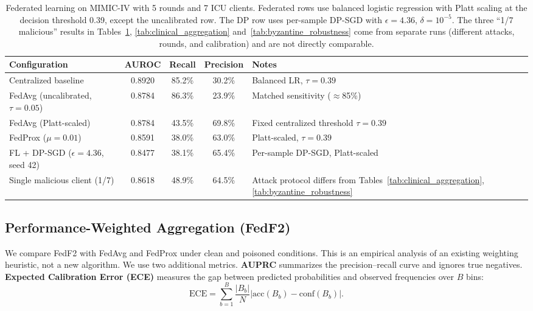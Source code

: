 \documentclass[journal]{IEEEtran}
\begin{document}
\begin{table}[t]
\caption{Federated learning on MIMIC-IV with 5 rounds and 7 ICU clients. Federated rows use balanced logistic regression with Platt scaling at the decision threshold 0.39, except the uncalibrated row. The DP row uses per-sample DP-SGD with $\epsilon=4.36$, $\delta=10^{-5}$. The three ``1/7 malicious'' results in Tables~\ref{tab:performance}, \ref{tab:clinical_aggregation} and~\ref{tab:byzantine_robustness} come from separate runs (different attacks, rounds, and calibration) and are not directly comparable.}
\centering
\small
\begin{tabular}{lcccl}
\toprule
\textbf{Configuration} & \textbf{AUROC} & \textbf{Recall} & \textbf{Precision} & \textbf{Notes} \\
\midrule
Centralized baseline & 0.8920 & 85.2\% & 30.2\% & Balanced LR, $\tau=0.39$ \\
FedAvg (uncalibrated, $\tau=0.05$) & 0.8784 & 86.3\% & 23.9\% & Matched sensitivity ($\approx$85\%) \\
FedAvg (Platt-scaled) & 0.8784 & 43.5\% & 69.8\% & Fixed centralized threshold $\tau=0.39$ \\
FedProx ($\mu=0.01$) & 0.8591 & 38.0\% & 63.0\% & Platt-scaled, $\tau=0.39$ \\
\midrule
FL + DP-SGD ($\epsilon = 4.36$, seed 42) & 0.8477 & 38.1\% & 65.4\% & Per-sample DP-SGD, Platt-scaled \\
\midrule
Single malicious client (1/7) & 0.8618 & 48.9\% & 64.5\% & Attack protocol differs from Tables~\ref{tab:clinical_aggregation}, \ref{tab:byzantine_robustness} \\
\bottomrule
\end{tabular}
\label{tab:performance}
\end{table}

\subsection{Performance-Weighted Aggregation (FedF2)}
\label{sec:fedf2_results}

We compare FedF2 with FedAvg and FedProx under clean and poisoned conditions. This is an empirical analysis of an existing weighting heuristic, not a new algorithm. We use two additional metrics. \textbf{AUPRC} summarizes the precision--recall curve and ignores true negatives. \textbf{Expected Calibration Error (ECE)} measures the gap between predicted probabilities and observed frequencies over $B$ bins:
\begin{equation}
\text{ECE} = \sum_{b=1}^{B} \frac{|B_b|}{N} \left| \text{acc}(B_b) - \text{conf}(B_b) \right|.
\end{equation}
\end{document}
